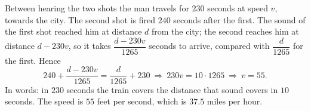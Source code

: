 Between hearing the two shots the man travels for $230$ seconds at speed $v$, towards the city. The second shot is fired $240$ seconds after the first. The sound of the first shot reached him at distance $d$ from the city; the second reaches him at distance $d-230v$, so it takes $\dfrac{d-230v}{1265}$ seconds to arrive, compared with $\dfrac{d}{1265}$ for the first. Hence
\[
240+\dfrac{d-230v}{1265}=\dfrac{d}{1265}+230\ \Longrightarrow\ 230v=10\cdot1265\ \Longrightarrow\ v=55 .
\]
In words: in $230$ seconds the train covers the distance that sound covers in $10$ seconds. The speed is $\boxed{55}$ feet per second, which is $37.5$ miles per hour.
